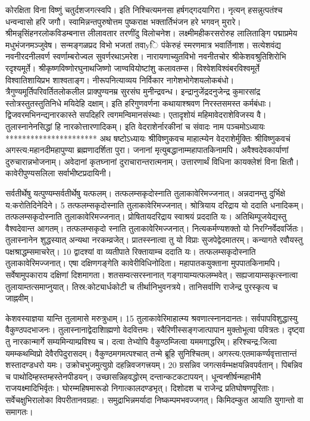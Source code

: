 कोरक्षिता विना विष्णुं चतुर्दशजगत्स्वपि।
 इति निश्चित्यमनसा हर्षगद्गदयागिरा।
 नृत्यन् हसन्नुत्पतंश्च धन्वन्वासो हरि जगौ।
 स्वामिन्नन्तपुरुषोत्तम पुष्कराक्ष
भक्तार्तिभंजन हरे भगवन् मुरारे।
 श्रीमन्नृसिंहनरलोकविडम्बनात्त
लीलावतार तरणींदु विलोचनेश।
 लक्ष्मीमहीकरसरोरुह लालिताङ्गि
पद्माप्रमेय मधुभंजनमञ्जुवेष।
 सन्मङ्गळप्रद विभो भजतां तवाyि
पंकेरुहं स्मरणमात्र भवार्तिनाश।
 सत्येशवंद्य नवनीरदनीलवर्ण
स्वर्णाम्बरोज्वल सुवर्णरथाऽमरेश।
 नारायणाच्युतविभो नवनीतचोर
श्रीकेशवश्रुतिशिरोभि रदृश्यमूर्ते।
 श्रीकृष्णविष्णोरघुनाथजिष्णो
जाण्ववियोष्टांशु कलावतम्स।
 विश्वेशविश्वंबरविश्वमूर्ते
विश्वातिशायिप्रभ शाश्वताङ्ग।
 नीरूपनित्याव्यय निर्विकार
नागेशभोगेशयलोकबंधो।
 त्रैगुण्यमूर्तिपरिवर्तितलोकलील
प्राक्पुण्यनम्र सुरसंघ मुनीन्द्रवन्ध।
 इन्द्रानुजेंद्रदनुजेन्द्र कुमारसांद्र
स्तोत्रस्तुतस्तुतिनिधे मयिदेहि दक्षाम्।
 इति हरिगुणवर्णना कथायाश्श्रवण
निरस्तसमस्त कर्मबंधाः।
 द्विजवरमभिनन्द्यनारकास्ते
सपदिहरि त्वगमन्विमानसंस्थाः।
 एतादृशोयं महिमावेदराशेविजस्य वै।
 तुलास्नानेनसिद्धां हि नारकोत्तारणादिकम्।
 इति वेदराशेर्नारकीनां च संवादः नाम
पञ्चमोऽध्यायः
**********************
अथ षष्टोऽध्यायः श्रीविष्णुकवच माहात्म्येन वेदराशेर्मुक्तिः
श्रीविष्णुकवचं अगस्त्य:महानदीमहापुण्या ब्रह्मणादर्शिता पुरा।
 जनानां मृत्युबद्धानाम्महापातकिनामपि।
 अवैश्वदेवकार्याणां दुरुचारान्नभोजनाम्।
 अवेदानां कृतघ्नानां दुराचारान्तरात्मनाम्।
 उत्तारणार्थं विधिना कायक्लेशं विना क्षितौ।
 कावेरीपुण्यसलिला सर्वाभीष्टप्रदायिनी।
 
सर्वतीर्थेषु यत्पुण्यम्सर्वतीर्थेषु यत्फलम्।
 तत्फलम्सकृदोस्नाति तुलाकावेरिमज्जनात्।
 अन्नदानम्तु दुर्भिक्षे य:करोतिदिनेदिने।
 5 तत्फलम्सकृदोस्नाति तुलाकावेरिमज्जनात्।
 श्रोत्रियाय दरिद्राय यो ददाति धनादिकम्।
 तत्फलम्सकृदोस्नाति तुलाकावेरिमज्जनात्।
 प्रोषितायदरिद्राय स्वाश्रयं प्रददाति यः।
 अतिथिम्पूजयेद्यस्तु वैश्वदेवान्त आगतम्।
 तत्फलम्सकृदो स्नाति तुलाकावेरिमज्जनात्।
 नित्यकर्मण्यशक्तो यो निरग्निर्वेदवर्जितः।
 तुलास्नानेन शुद्धस्यात् अन्यथा नरकम्व्रजेत्।
 प्रातस्स्नात्वा तु यो विप्राः सुजपेद्वेदमातरम्।
 कन्यागते रवौयस्तु पक्षश्राद्धम्समाचरेत्।
 10 द्वादश्यां वा व्यतीपाते रिक्तायाम्च ददाति यः।
 तत्फलम्सकृदोस्नाति तुलाकावेरिमज्जनात्।
 एषा दक्षिणगङ्गेति कावेरीविधिनोदिता।
 महापातकयुक्ताना मुपपातकिनामपि।
 सर्वेषामुपकाराय दक्षिणां दिशमागता।
 शतसम्वत्सरस्नानात् गङ्गायाम्यत्फलम्भवेत्।
 सह्यजायाम्सकृत्स्नात्वा तुलायाम्तत्समाप्नुयात्।
 तिस्र:कोट्यार्धकोटी च तीर्थानिभुवनत्रये।
 तानिसर्वाणि राजेन्द्र पुरस्कृत्य च जाह्नवीम्।
 
केशवस्याज्ञया यान्ति तुलामासे मरुत्रुधाम्।
 15 तुलाकावेरिमाहात्म्य श्रवणात्स्नानदानतः।
 सर्वपापविशुद्धास्यु वैकुण्ठपदभाजनः।
 तुलास्नानाद्वेदाशिाह्मणो वेदवित्तमः।
 स्वैरिणीस्सङ्गजात्पापान मुक्तोभूत्वा पवित्रतः।
 दृष्ट्वा तु नारकान्मार्गे सम्यमिन्याम्प्रविश्य च।
 दत्वा तेभ्योपि वैकुण्ठम्जित्वा यममगाद्धरिम्।
 हरिश्चन्द्र:जित्वा यमम्कथम्विप्रो देवैरपिदुरासदम्।
 वैकुण्ठमगमत्पश्चात् तन्मे ब्रूहि सुनिश्चितम्।
 अगस्त्य:एतमाकर्ण्यवृत्तात्तान्तं शस्तादण्डधरो यमः।
 उक्रोचभुजमुत्युग्रो दहन्निवजगत्त्रयम्।
 20 ग्रसन्निव जगत्सर्वम्भक्षयन्निवपर्वतान्।
 पिबन्निव च पाथोदिम्हस्तम्हस्तेनपीडयन्।
 उच्छासन्निहवद्धोरम् दन्तान्कटकटापयन्।
 धून्वन्शीर्षन्महाभीमै राजयक्ष्मादिभिर्वृतः।
 घोरम्महिषमारूडो निगात्कालदण्डभृत्।
 दिशोदश च राजेन्द्र प्रतिघोषणपूरिताः।
 सर्वेचक्षुभिरालोका विपरीतानवग्रहा:।
 समुद्राभिन्नमर्यादा निष्कम्पमभवज्जगत्।
 किमिदम्कुत आयाति युगान्तो वा समागतः।
 

